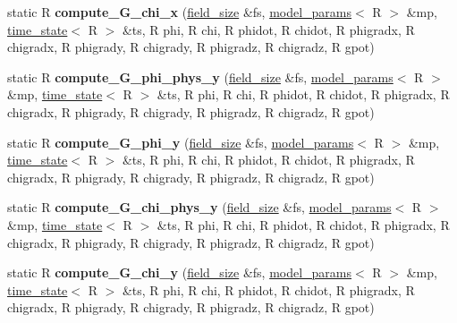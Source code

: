 \begin{DoxyCompactItemize}
\item 
\hypertarget{structgrid__funcs_a534524a918aace56da48a0ce568f21ec}{
static R {\bfseries compute\_\-G\_\-chi\_\-x} (\hyperlink{structfield__size}{field\_\-size} \&fs, \hyperlink{structmodel__params}{model\_\-params}$<$ R $>$ \&mp, \hyperlink{structtime__state}{time\_\-state}$<$ R $>$ \&ts, R phi, R chi, R phidot, R chidot, R phigradx, R chigradx, R phigrady, R chigrady, R phigradz, R chigradz, R gpot)}
\label{structgrid__funcs_a534524a918aace56da48a0ce568f21ec}

\item 
\hypertarget{structgrid__funcs_a3124ec8c0f2ffb3e78ff04c1b3138a5a}{
static R {\bfseries compute\_\-G\_\-phi\_\-phys\_\-y} (\hyperlink{structfield__size}{field\_\-size} \&fs, \hyperlink{structmodel__params}{model\_\-params}$<$ R $>$ \&mp, \hyperlink{structtime__state}{time\_\-state}$<$ R $>$ \&ts, R phi, R chi, R phidot, R chidot, R phigradx, R chigradx, R phigrady, R chigrady, R phigradz, R chigradz, R gpot)}
\label{structgrid__funcs_a3124ec8c0f2ffb3e78ff04c1b3138a5a}

\item 
\hypertarget{structgrid__funcs_a6186486770291246657a8e7c2aecf2de}{
static R {\bfseries compute\_\-G\_\-phi\_\-y} (\hyperlink{structfield__size}{field\_\-size} \&fs, \hyperlink{structmodel__params}{model\_\-params}$<$ R $>$ \&mp, \hyperlink{structtime__state}{time\_\-state}$<$ R $>$ \&ts, R phi, R chi, R phidot, R chidot, R phigradx, R chigradx, R phigrady, R chigrady, R phigradz, R chigradz, R gpot)}
\label{structgrid__funcs_a6186486770291246657a8e7c2aecf2de}

\item 
\hypertarget{structgrid__funcs_a6d184d7a957a84aace8f736cf531f2e6}{
static R {\bfseries compute\_\-G\_\-chi\_\-phys\_\-y} (\hyperlink{structfield__size}{field\_\-size} \&fs, \hyperlink{structmodel__params}{model\_\-params}$<$ R $>$ \&mp, \hyperlink{structtime__state}{time\_\-state}$<$ R $>$ \&ts, R phi, R chi, R phidot, R chidot, R phigradx, R chigradx, R phigrady, R chigrady, R phigradz, R chigradz, R gpot)}
\label{structgrid__funcs_a6d184d7a957a84aace8f736cf531f2e6}

\item 
\hypertarget{structgrid__funcs_ae9fb3495e1371edcc3da50f152bb4030}{
static R {\bfseries compute\_\-G\_\-chi\_\-y} (\hyperlink{structfield__size}{field\_\-size} \&fs, \hyperlink{structmodel__params}{model\_\-params}$<$ R $>$ \&mp, \hyperlink{structtime__state}{time\_\-state}$<$ R $>$ \&ts, R phi, R chi, R phidot, R chidot, R phigradx, R chigradx, R phigrady, R chigrady, R phigradz, R chigradz, R gpot)}
\label{structgrid__funcs_ae9fb3495e1371edcc3da50f152bb4030}


\end{DoxyCompactItemize}
